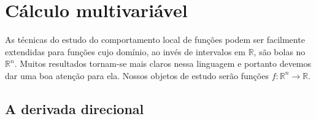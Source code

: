 \documentclass[a4paper, 12pt]{article}
\theoremstyle{definition}
\theoremstyle{definition}
\begin{document}
\appendix

\section{Cálculo multivariável}

As técnicas do estudo do comportamento local de funções podem ser facilmente extendidas para funções cujo
domínio, ao invés de intervalos em $\mathbb R$, são bolas no $\mathbb R^n$. Muitos resultados tornam-se 
mais claros nessa linguagem e portanto devemos dar uma boa atenção para ela. Nossos objetos de estudo serão
funções $f:\mathbb R^n\rightarrow\mathbb R$.

\subsection{A derivada direcional}
\end{document}
